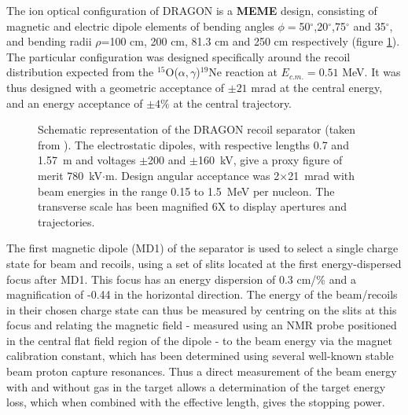 The ion optical configuration of DRAGON is a {\bf MEME} design, consisting of magnetic and electric  dipole elements of bending angles $\phi=$50$^{\circ}$,20$^{\circ}$,75$^{\circ}$ and 35$^{\circ}$, and bending radii $\rho$=100 cm, 200 cm, 81.3 cm and 250 cm respectively (figure \ref{fig:dra_optics}). The particular configuration was designed specifically around the recoil distribution expected from the $^{15}$O($\alpha ,\gamma$)$^{19}$Ne reaction at $E_{c.m.}=0.51$ MeV. It was thus designed with a geometric acceptance of $\pm21$ mrad at the central energy, and an energy acceptance of $\pm4\%$ at the central trajectory. 
\begin{figure}
\begin{center}
\caption{Schematic representation of the DRAGON recoil separator (taken from \cite{hut03}). The electrostatic dipoles, with respective lengths 0.7 and 1.57~m and voltages $\pm$200 and $\pm$160~kV, give a proxy figure of merit 780~kV$\cdot$m.  Design angular acceptance was 2$\times$21~mrad with beam energies in the range 0.15 to 1.5~MeV per nucleon. The transverse scale has been magnified 6X to display apertures and trajectories.}
\label{fig:dra_optics}
\end{center}
\end{figure}

The first magnetic dipole (MD1) of the separator is used to select a single charge state for beam and recoils, using a set of slits located at the first energy-dispersed focus after MD1. This focus has an energy dispersion of 0.3 cm/\% and a magnification of -0.44 in the horizontal direction. The energy of the beam/recoils in their chosen charge state can thus be measured by centring on the slits at this focus and relating the magnetic field - measured using an NMR probe positioned in the central flat field region of the dipole - to the beam energy via the magnet calibration constant, which has been determined using several well-known stable beam proton capture resonances. Thus a direct measurement of the beam energy with and without gas in the target allows a determination of the target energy loss, which when combined with the effective length, gives the stopping power. 

